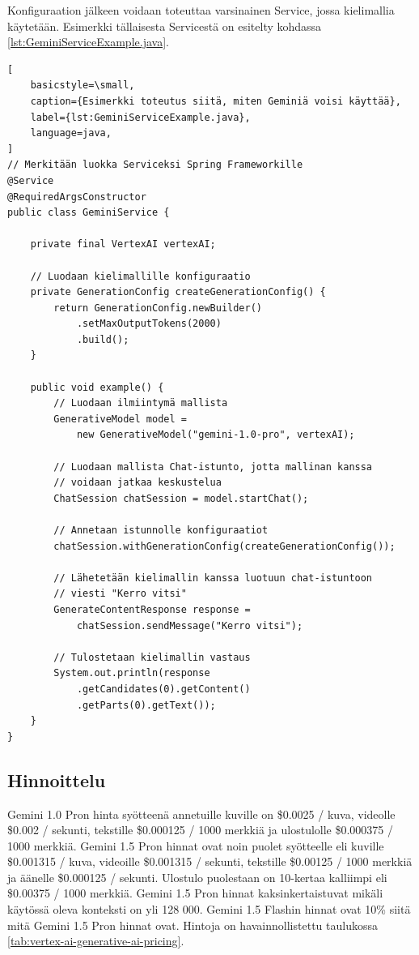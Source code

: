 Konfiguraation jälkeen voidaan toteuttaa varsinainen Service, jossa kielimallia
käytetään. Esimerkki tällaisesta Servicestä on esitelty kohdassa
\ref{lst:GeminiServiceExample.java}.

\begin{lstlisting}[
    basicstyle=\small,
    caption={Esimerkki toteutus siitä, miten Geminiä voisi käyttää},
    label={lst:GeminiServiceExample.java},
    language=java,
]
// Merkitään luokka Serviceksi Spring Frameworkille
@Service
@RequiredArgsConstructor
public class GeminiService {

    private final VertexAI vertexAI;

    // Luodaan kielimallille konfiguraatio
    private GenerationConfig createGenerationConfig() {
        return GenerationConfig.newBuilder()
            .setMaxOutputTokens(2000)
            .build();
    }

    public void example() {
        // Luodaan ilmiintymä mallista
        GenerativeModel model =
            new GenerativeModel("gemini-1.0-pro", vertexAI);

        // Luodaan mallista Chat-istunto, jotta mallinan kanssa
        // voidaan jatkaa keskustelua
        ChatSession chatSession = model.startChat();

        // Annetaan istunnolle konfiguraatiot
        chatSession.withGenerationConfig(createGenerationConfig());

        // Lähetetään kielimallin kanssa luotuun chat-istuntoon
        // viesti "Kerro vitsi"
        GenerateContentResponse response =
            chatSession.sendMessage("Kerro vitsi");

        // Tulostetaan kielimallin vastaus
        System.out.println(response
            .getCandidates(0).getContent()
            .getParts(0).getText());
    }
}
\end{lstlisting}

\subsection{Hinnoittelu}

Gemini 1.0 Pron hinta syötteenä annetuille kuville on \$0.0025 / kuva, videolle
\$0.002 / sekunti, tekstille \$0.000125 / 1000 merkkiä ja ulostulolle
\$0.000375 / 1000 merkkiä. Gemini 1.5 Pron hinnat ovat noin puolet syötteelle
eli kuville \$0.001315 / kuva, videoille \$0.001315 / sekunti, tekstille
\$0.00125 / 1000 merkkiä ja äänelle \$0.000125 / sekunti. Ulostulo puolestaan
on 10-kertaa kalliimpi eli \$0.00375 / 1000 merkkiä. Gemini 1.5 Pron hinnat
kaksinkertaistuvat mikäli käytössä oleva konteksti on yli 128 000. Gemini
1.5 Flashin hinnat ovat 10\% siitä mitä Gemini 1.5 Pron hinnat ovat.
\parencite{vertexAiGenerativeAiPricing} Hintoja on havainnollistettu taulukossa
\ref{tab:vertex-ai-generative-ai-pricing}.

